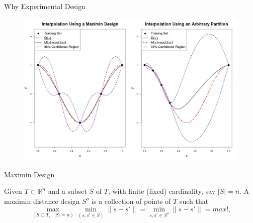 \documentclass[11pt]{beamer}
\theoremstyle{plain}
\theoremstyle{definition}
\begin{document}
\begin{frame}{Why Experimental Design}
\begin{figure}
\includegraphics[scale=0.2]{../FigChap2/partitionComparison.jpg}
\end{figure}

\end{frame}

\begin{frame}{Maximin Design}

Given $T\subset\mathbb{R}^{n}$ and a subset $S$ of $T$, 
with finite (fixed) cardinality, say $|S|=n$.
A maximin distance design $S^{o}$ is a collection of points of $T$  such that
\begin{equation*}
\max_{(S\subset T,\text{ }|S|=n)}\min_{(s,s'\in S)}\|s-s'\|=\min_{s,s'\in S^{o}}\|s-s'\|=max!,
\end{equation*}
\end{frame}
\end{document}
